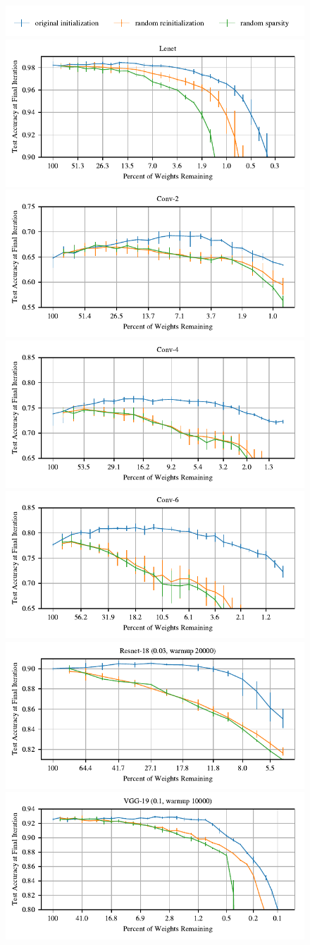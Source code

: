 \begin{figure}
\centering
\includegraphics[width=.7\textwidth]{graphs/random/mnist/vanilla/legend}
\includegraphics[width=.5\textwidth]{graphs/random/mnist/vanilla/accuracy}%
\includegraphics[width=.5\textwidth]{graphs/random/conv/conv_paper1/accuracy}
\includegraphics[width=.5\textwidth]{graphs/random/conv/conv_paper2/accuracy}%
\includegraphics[width=.5\textwidth]{graphs/random/conv/conv_paper3/accuracy}
\includegraphics[width=.5\textwidth]{graphs/cifar10/icml/resnet18-iclr-rearr-29900-0.03-20K/accuracy}%
\includegraphics[width=.5\textwidth]{graphs/cifar10/icml/vgg19-iclr-rearr-112000-0.1-10K/accuracy}

\end{figure}
